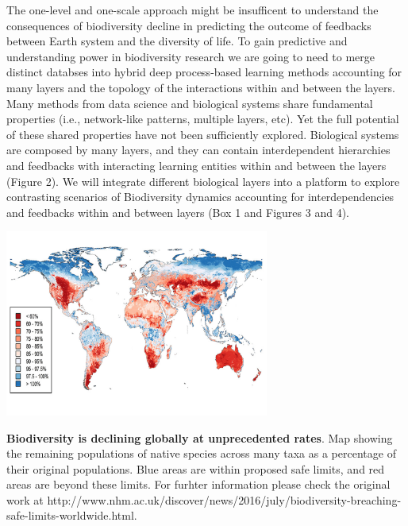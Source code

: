\documentclass[authoryear,1p,12pt]{elsarticle}
\begin{document}
     
     The one-level and one-scale approach might be insufficent to
     understand the consequences of biodiversity decline in predicting
     the outcome of feedbacks between Earth system and the diversity
     of life. To gain predictive and understanding power in
     biodiversity research we are going to need to merge distinct
     databses into hybrid deep process-based learning methods
     accounting for many layers and the topology of the interactions
     within and between the layers\citep{Melianetal:2018}. Many
     methods from data science and biological systems share
     fundamental properties (i.e., network-like patterns, multiple
     layers, etc). Yet the full potential of these shared properties
     have not been sufficiently explored. Biological systems are
     composed by many layers, and they can contain interdependent
     hierarchies and feedbacks with interacting learning entities
     within and between the layers (Figure 2). We will integrate
     different biological layers into a platform to explore
     contrasting scenarios of Biodiversity dynamics accounting for
     interdependencies and feedbacks within and between layers (Box 1
     and Figures 3 and 4).


  \begin{center}
       \includegraphics[width=0.65\textwidth]{Figure1}
  \end{center}
     \vspace{-0.7 in}
     \caption{{\bf Biodiversity is declining globally at unprecedented
         rates}. Map showing the remaining populations of native
       species across many taxa as a percentage of their original
       populations. Blue areas are within proposed safe limits, and
       red areas are beyond these limits. For furhter information
       please check the original work at
       {http://www.nhm.ac.uk/discover/news/2016/july/biodiversity-breaching-safe-limits-worldwide.html}.}
\end{document}
